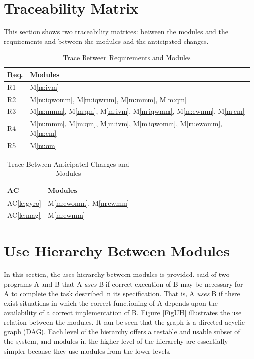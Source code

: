 \documentclass[12pt, titlepage]{article}
\newcommand{\acref}[1]{AC\ref{#1}}
\newcommand{\mref}[1]{M\ref{#1}}
\begin{document}
\section{Traceability Matrix} \label{SecTM}

This section shows two traceability matrices: between the modules and the requirements and between
the modules and the anticipated changes.

\begin{table}[H]
\centering
\begin{tabular}{p{} p{}}
\toprule
\textbf{Req.} & \textbf{Modules}\\
\midrule
R1 & \mref{m:ivm} \\
R2 & \mref{m:iqwomm}, \mref{m:iqwmm}, \mref{m:mmm}, \mref{m:qm}\\
R3 & \mref{m:mmm}, \mref{m:qm}, \mref{m:ivm}, \mref{m:iqwmm}, \mref{m:ewmm}, \mref{m:cm}\\
R4 & \mref{m:mmm}, \mref{m:qm}, \mref{m:ivm}, \mref{m:iqwomm}, \mref{m:ewomm}, \mref{m:cm}\\
R5 & \mref{m:qm}\\
\bottomrule
\end{tabular}
\caption{Trace Between Requirements and Modules}
\label{TblRT}
\end{table}

\begin{table}[H]
\centering
\begin{tabular}{p{} p{}}
\toprule
\textbf{AC} & \textbf{Modules}\\
\midrule
\acref{lc:gyro} & \mref{m:ewomm}, \mref{m:ewmm}\\
\acref{lc:mag} & \mref{m:ewmm}\\
\bottomrule
\end{tabular}
\caption{Trace Between Anticipated Changes and Modules}
\label{TblACT}
\end{table}

\section{Use Hierarchy Between Modules} \label{SecUse}

In this section, the uses hierarchy between modules is provided. \citet{Parnas1978} said of two
programs A and B that A {\em uses} B if correct execution of B may be necessary for A to complete
the task described in its specification. That is, A {\em uses} B if there exist situations in which
the correct functioning of A depends upon the availability of a correct implementation of B.  Figure
\ref{FigUH} illustrates the use relation between the modules. It can be seen that the graph is a
directed acyclic graph (DAG). Each level of the hierarchy offers a testable and usable subset of the
system, and modules in the higher level of the hierarchy are essentially simpler because they use
modules from the lower levels.
\end{document}
